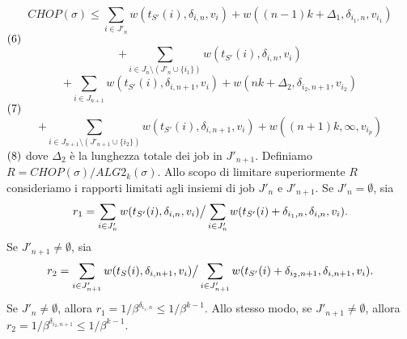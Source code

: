 \documentclass[12pt]{article}
\begin{document}
$$CHOP(\sigma) \leq \sum_{i \in J'_{n}} w (t_{S'}(i), \delta_{i,n},v_{i}) + w ((n - 1) k + \Delta_{1}, \delta_{i_{1},n}, v_{i_{1}})$$ $\hfill (6)$
$$+ \sum_{i\in J_{n} \setminus (J'_{n}\cup \{i_{1}\})} w(t_{S'}(i), \delta_{i,n},v_{i})$$
$$+ \sum_{i \in J_{n+1}}w (t_{S'} (i), \delta_{i,n + 1},v_{i}) + w (nk + \Delta_{2}, \delta_{i_{2}, n+1}, v_{i_{2}})$$ $\hfill (7)$
$$+ \sum_{i \in J_{n+1} \setminus (J'_{n+1} \cup \{i_{2}\})} w (t_{S'} (i), \delta_{i,n+1}, v_{i}) + w ((n + 1) k, \infty, v_{i_{p}})$$ $\hfill (8)$
dove $\Delta_{2}$ è la lunghezza totale dei job in $J'_{n+1}$. Definiamo $R = CHOP(\sigma) / ALG2_{k} (\sigma).$ Allo scopo di limitare superiormente $R$ consideriamo i rapporti limitati agli insiemi di job $J'_{n}$ e $J'_{n+1}$. Se $J'_{n} = \emptyset$, sia
$$r_{1} = \sum_{i\in J'_{n}} w(t_{S'}(i), \delta_{i,n}, v_{i}) \big{/} \sum_{i \in J'_{n}} w (t_{S'}(i) + \delta_{i_{1},n}, \delta_{i,n}, v_{i}).$$
Se $J'_{n+1} \neq \emptyset$, sia
$$r_{2} = \sum_{i \in J'_{n+1}} w (t_{S} (i), \delta_{i,n+1}, v_{i}) \big{/} \sum_{i \in J'_{n+1}} w (t_{S'} (i) + \delta_{i_{2}, n+1}, \delta_{i,n+1}, v_{i}).$$
Se $J'_{n} \neq \emptyset$, allora $r_{1} = 1 / \beta^{\delta_{i_{1},n}} \leq 1 / \beta^{k-1}$. Allo stesso modo, se $J'_{n+1} \neq \emptyset$, allora $r_{2} = 1 / \beta^{\delta_{i_{2}, n+1}} \leq 1 / \beta^{k-1}$.
\end{document}
